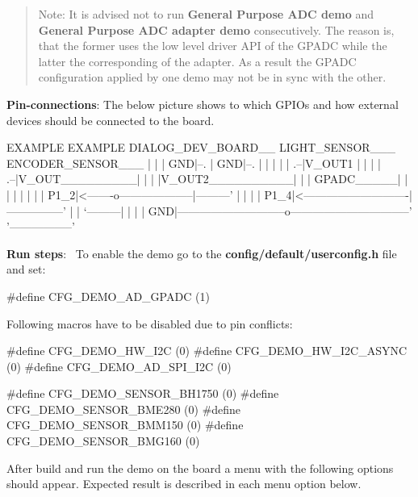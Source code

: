 \begin{quote}
Note\+: It is advised not to run {\bfseries General Purpose A\+D\+C demo} and {\bfseries General Purpose A\+D\+C adapter demo} consecutively. The reason is, that the former uses the low level driver A\+P\+I of the G\+P\+A\+D\+C while the latter the corresponding of the adapter. As a result the G\+P\+A\+D\+C configuration applied by one demo may not be in sync with the other. \end{quote}



\begin{DoxyItemize}
\item {\bfseries Pin-\/connections}\+: The below picture shows to which G\+P\+I\+Os and how external devices should be connected to the board.
\end{DoxyItemize}


\begin{DoxyPre}
                                 EXAMPLE                        EXAMPLE
   DIALOG\_DEV\_BOARD\_\_            LIGHT\_SENSOR\_\_\_                ENCODER\_SENSOR\_\_\_
   |                 |           |           GND|--.            |             GND|--.
   |                 |           |              |  |         .--|V\_OUT1          |  |
   |                 |        .--|V\_OUT\_\_\_\_\_\_\_\_\_|  |         |  |V\_OUT2\_\_\_\_\_\_\_\_\_\_|  |
   |       GPADC\_\_\_\_\_|        |                    |         |     |                |
   |       |     P1\_2|<-------o--------------------|---------'     |                |
   |       |     P1\_4|<----------------------------|---------------'                |
   |       `---------|                             |                                |
   |              GND|-----------------------------o--------------------------------'
   '-----------------'
\end{DoxyPre}



\begin{DoxyItemize}
\item {\bfseries Run steps}\+:~\newline
 To enable the demo go to the {\bfseries {\ttfamily config/default/userconfig.\+h}} file and set\+: 
\begin{DoxyCode}
\textcolor{preprocessor}{#define CFG\_DEMO\_AD\_GPADC       (1)}
\end{DoxyCode}
 Following macros have to be disabled due to pin conflicts\+: 
\begin{DoxyCode}
\textcolor{preprocessor}{#define CFG\_DEMO\_HW\_I2C         (0)}
\textcolor{preprocessor}{#define CFG\_DEMO\_HW\_I2C\_ASYNC   (0)}
\textcolor{preprocessor}{#define CFG\_DEMO\_AD\_SPI\_I2C     (0)}

\textcolor{preprocessor}{#define CFG\_DEMO\_SENSOR\_BH1750  (0)}
\textcolor{preprocessor}{#define CFG\_DEMO\_SENSOR\_BME280  (0)}
\textcolor{preprocessor}{#define CFG\_DEMO\_SENSOR\_BMM150  (0)}
\textcolor{preprocessor}{#define CFG\_DEMO\_SENSOR\_BMG160  (0)}
\end{DoxyCode}
 After build and run the demo on the board a menu with the following options should appear. Expected result is described in each menu option below.
\end{DoxyItemize}

